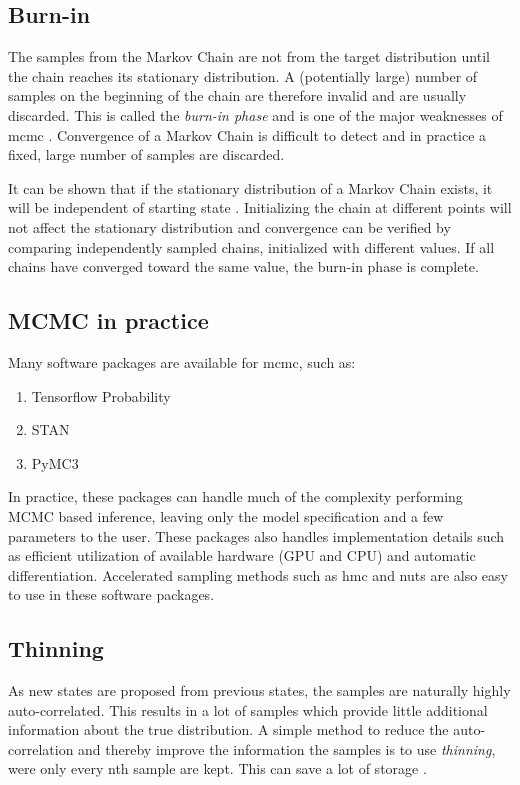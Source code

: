 \subsection{Burn-in}
The samples from the Markov Chain are not from the target distribution until the chain reaches its stationary distribution. A (potentially large) number of samples on the beginning of the chain are therefore invalid and are usually discarded. This is called the \textit{burn-in phase} and is one of the major weaknesses of \acrshort{mcmc} \cite{murphy}. Convergence of a Markov Chain is difficult to detect and in practice a fixed, large number of samples are discarded.   

It can be shown that if the stationary distribution of a Markov Chain exists, it will be independent of starting state \cite{murphy}. Initializing the chain at different points will not affect the stationary distribution and convergence can be verified by comparing independently sampled chains, initialized with different values. If all chains have converged toward the same value, the burn-in phase is complete.    

\subsection{MCMC in practice}
Many software packages are available for \acrshort{mcmc}, such as: 

\begin{enumerate}
    \item Tensorflow Probability \cite{tensorflow2015-whitepaper}
    \item STAN \cite{stan}
    \item PyMC3 \cite{pymc3}
\end{enumerate}

In practice, these packages can handle much of the complexity performing MCMC based inference, leaving only the model specification and a few parameters to the user. These packages also handles implementation details such as efficient utilization of available hardware (GPU and CPU) and automatic differentiation. Accelerated sampling methods such as \acrshort{hmc} and \acrshort{nuts} are also easy to use in these software packages.   

\subsection{Thinning}
As new states are proposed from previous states, the samples are naturally highly auto-correlated. This results in a lot of samples which provide little additional information about the true distribution. A simple method to reduce the auto-correlation and thereby improve the information the samples is to use \textit{thinning}, were only every nth sample are kept. This can save a lot of storage \cite{murphy}.

